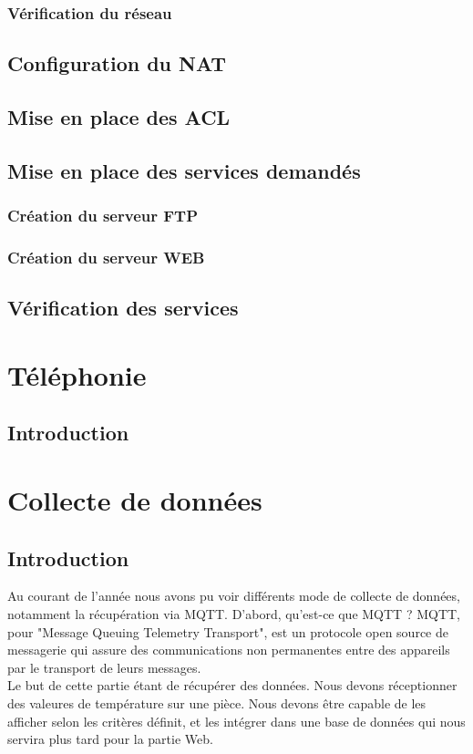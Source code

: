 \documentclass[12pt, a4paper]{article}
\begin{document}
		\subsubsection{Vérification du réseau}

	\subsection{Configuration du NAT}

	\subsection{Mise en place des ACL}

	\subsection{Mise en place des services demandés}

		\subsubsection{Création du serveur FTP}

		\subsubsection{Création du serveur WEB}
	
	\subsection{Vérification des services}




\newpage
\section{Téléphonie}
\subsection{Introduction}


\newpage
\section{Collecte de données}
\subsection{Introduction}
Au courant de l'année nous avons pu voir différents mode de collecte de
données, notamment la récupération via MQTT. D'abord, qu'est-ce que MQTT ?
MQTT, pour "Message Queuing Telemetry Transport", est un protocole
open source de messagerie qui assure des communications non permanentes
entre des appareils par le transport de leurs messages.\\
Le but de cette partie étant de récupérer des données. Nous devons réceptionner
des valeures de température sur une pièce. Nous devons être capable de
les afficher selon les critères définit, et les intégrer dans une base de
données qui nous servira plus tard pour la partie Web. 
\end{document}
